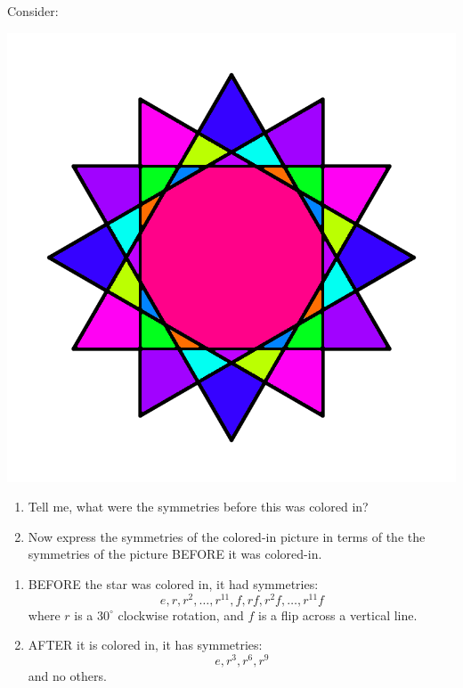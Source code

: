 \documentclass[noauthor,nooutcomes,hints]{ximera}
\begin{document}
\begin{question}
  Consider: 
  \begin{center}
    \includegraphics[width=.6\textwidth]{qR4D12.png}
  \end{center}
  \begin{enumerate}
  \item Tell me, what were the symmetries before this was colored in?
  \item Now express the symmetries of the colored-in picture in terms
    of the the symmetries of the picture BEFORE it was colored-in.
  \end{enumerate}
  \begin{freeResponse}
    \begin{enumerate}
    \item BEFORE the star was colored in, it had symmetries:
      \[
      e,r,r^2,\dots,r^{11}, f, rf,r^2f, \dots, r^{11}f
      \]
      where $r$ is a $30^\circ$ clockwise rotation, and $f$ is a flip
      across a vertical line.
    \item AFTER it is colored in, it has symmetries:
      \[
      e, r^3, r^6, r^9
      \]
      and no others.
    \end{enumerate}
  \end{freeResponse}
\end{question}
\mynewpage
\end{document}
